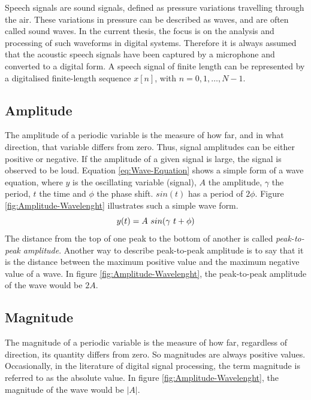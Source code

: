 Speech signals are sound signals, defined as pressure variations travelling through the air. These variations in pressure can be described as waves, and are often called sound waves. In the current thesis, the focus is on the analysis and processing of such waveforms in digital systems. Therefore it is always assumed that the acoustic speech signals have been captured by a microphone and converted to a digital form.
\newline
\newline
A speech signal of finite length can be represented by a digitalised finite-length sequence $x[n]$, with $n = 0, 1, \dots, N-1$.

\subsection{Amplitude}
\label{sub:Amplitude}

The amplitude of a periodic variable is the measure of how far, and in what direction, that variable differs from zero. Thus, signal amplitudes can be either positive or negative. If the amplitude of a given signal is large, the signal is observed to be loud. Equation \ref{eq:Wave-Equation} shows a simple form of a wave equation, where $y$ is the oscillating variable (signal), $A$ the amplitude, $\gamma$ the period, $t$ the time and $\phi$ the phase shift. $sin(t)$ has a period of $2 \phi$. Figure \ref{fig:Amplitude-Wavelenght} illustrates such a simple wave form. 
\begin{equation}
    \centering
    y(t) = A \ sin(\gamma \ t + \phi)
    \label{eq:Wave-Equation}
\end{equation}
The distance from the top of one peak to the bottom of another is called \textit{peak-to-peak amplitude}. Another way to describe peak-to-peak amplitude is to say that it is the distance between the maximum positive value and the maximum negative value of a wave. In figure \ref{fig:Amplitude-Wavelenght}, the peak-to-peak amplitude of the wave would be $2A$.

\subsection{Magnitude}
\label{sub:Magnitude}

The magnitude of a periodic variable is the measure of how far, regardless of direction, its quantity differs from zero. So magnitudes are always positive values. Occasionally, in the literature of digital signal processing, the term magnitude is referred to as the absolute value. In figure \ref{fig:Amplitude-Wavelenght}, the magnitude of the wave would be $|A|$.

